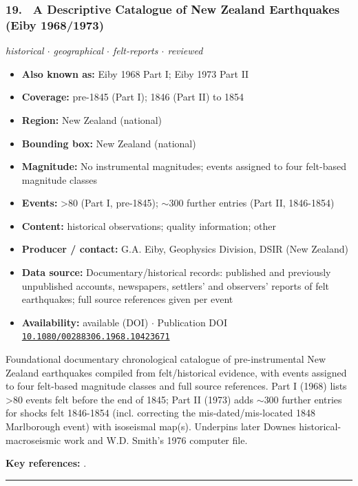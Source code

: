 \documentclass[10pt,a4paper]{article}
\newcommand{\catentryrule}{\par\vspace{3pt}\noindent\textcolor{rulegrey}{\rule{\linewidth}{0.3pt}}\par\vspace{5pt}}
\newcommand{\kv}[2]{\item \textbf{#1:} #2}
\begin{document}
\subsubsection*{\hypertarget{c:19}{19.}~ A Descriptive Catalogue of New Zealand Earthquakes (Eiby 1968/1973)}
{\small\itshape historical $\cdot$ geographical $\cdot$ felt-reports $\cdot$ reviewed}\par\vspace{2pt}
\begin{itemize}[leftmargin=1.3em,itemsep=0.6pt,topsep=1pt,parsep=0pt]
\kv{Also known as}{Eiby 1968 Part I; Eiby 1973 Part II}
\kv{Coverage}{pre-1845 (Part I); 1846 (Part II) to 1854}
\kv{Region}{New Zealand (national)}
\kv{Bounding box}{New Zealand (national)}
\kv{Magnitude}{No instrumental magnitudes; events assigned to four felt-based magnitude classes}
\kv{Events}{\textgreater{}80 (Part I, pre-1845); $\sim$300 further entries (Part II, 1846-1854)}
\kv{Content}{historical observations; quality information; other}
\kv{Producer / contact}{G.A. Eiby, Geophysics Division, DSIR (New Zealand)}
\kv{Data source}{Documentary/historical records: published and previously unpublished accounts, newspapers, settlers' and observers' reports of felt earthquakes; full source references given per event}
\kv{Availability}{available (DOI) $\cdot$ Publication DOI \href{https://doi.org/10.1080/00288306.1968.10423671}{\nolinkurl{10.1080/00288306.1968.10423671}}}
\end{itemize}
\par\vspace{2pt}Foundational documentary chronological catalogue of pre-instrumental New Zealand earthquakes compiled from felt/historical evidence, with events assigned to four felt-based magnitude classes and full source references. Part I (1968) lists \textgreater{}80 events felt before the end of 1845; Part II (1973) adds $\sim$300 further entries for shocks felt 1846-1854 (incl. correcting the mis-dated/mis-located 1848 Marlborough event) with isoseismal map(s). Underpins later Downes historical-macroseismic work and W.D. Smith's 1976 computer file.
\par\vspace{2pt}\textbf{Key references:} \cite{Eiby1968,Eiby1973}.
\catentryrule
\end{document}
